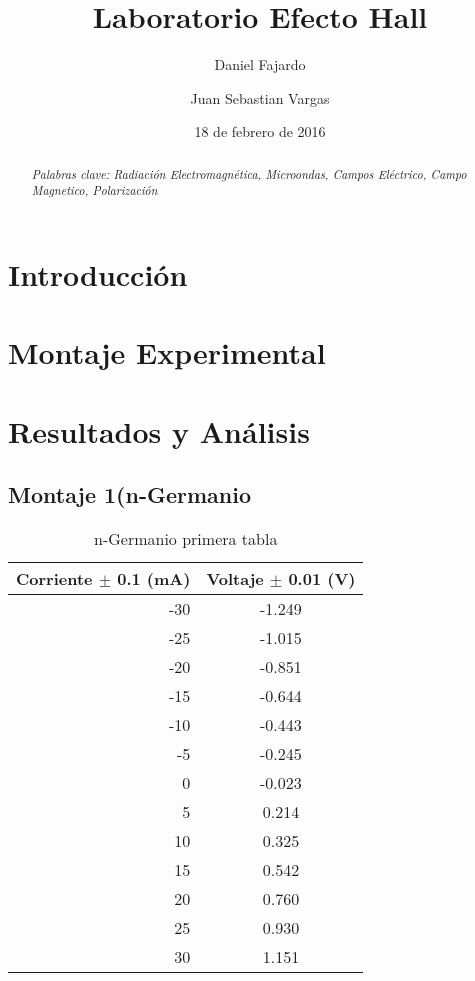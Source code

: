 \documentclass[aps,prl,reprint]{revtex4-1}
\begin{document}
\title{Laboratorio Efecto Hall}

\author{Daniel Fajardo}
\author{Juan Sebastian Vargas}
 

\date{18 de febrero de 2016}

\setlength{\columnsep}{1cm}





\begin{abstract}
    

\textit{Palabras clave: Radiación Electromagn\'etica, Microondas, Campos El\'ectrico, Campo Magnetico, Polarización}


\end{abstract}
\maketitle

\section{Introducci\'on}
  
\section{Montaje Experimental}


\section{Resultados y An\'alisis}
 \subsection{\label{sec:level2}Montaje 1(n-Germanio}
 
\begin{table}[H]
\begin{center}
\begin{tabular}{|| r || c ||} 
\hline\hline
Corriente $\pm$ 0.1 (mA)& Voltaje $\pm$ 0.01 (V)  \\
\hline

-30&-1.249\\
-25&-1.015 \\
-20&-0.851 \\
-15&-0.644 \\
-10&-0.443 \\
-5&-0.245 \\
0&-0.023 \\
5&0.214 \\
10&0.325 \\
15&0.542 \\
20&0.760 \\
25&0.930 \\
30&1.151 \\


\hline\hline
\end{tabular}
\end{center}
\caption{n-Germanio primera tabla}
\label{1n}
\end{table}
\end{document}
